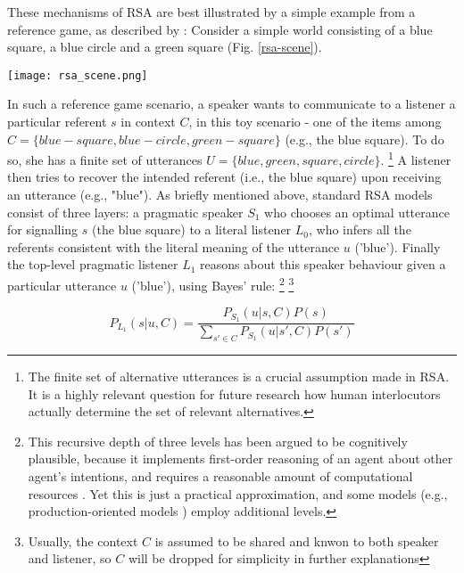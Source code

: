 These mechanisms of RSA are best illustrated by a simple example from a reference game, as described by \textcite{frank2012predicting}:
Consider a simple world consisting of a blue square, a blue circle and a green square (Fig. \ref{rsa-scene}).
\begin{figure*}[t]
	\begin{center}
		\texttt{[image: rsa\_scene.png]}
	\end{center}
	\vspace{-0.3cm}
	\caption{A simple reference resolution example scenario: the context $C$ consists of three possible referents \parencite{frank2012predicting}}
	\label{rsa-scene}
\end{figure*}
In such a reference game scenario, a speaker wants to communicate to a listener a particular referent $s$ in context $C$, in this toy scenario - one of the items among $C = \{blue-square, blue-circle, green-square\}$  (e.g., the blue square). To do so, she has a finite set of utterances $U = \{blue, green, square, circle\}$.  \footnote{The finite set of alternative utterances is a crucial assumption made in RSA. It is a highly relevant question for future research how human interlocutors actually determine the set of relevant alternatives.} A listener then tries to recover the intended referent (i.e., the blue square) upon receiving an utterance (e.g., "blue"). 
As briefly mentioned above, standard RSA models consist of three layers: a pragmatic speaker $S_1$ who chooses an optimal utterance for signalling $s$ (the blue square) to a literal listener $L_0$, who infers all the referents consistent with the literal meaning of the utterance $u$ ('blue'). Finally the top-level pragmatic listener $L_1$ reasons about this speaker behaviour given a particular utterance $u$ ('blue'), using Bayes' rule: \footnote{This recursive depth of three levels has been argued to be cognitively plausible, because it implements first-order reasoning of an agent about other agent's intentions, and requires a reasonable amount of computational resources \parencite{frank2012predicting}. Yet this is just a practical approximation, and some models (e.g., production-oriented models ) employ additional levels.\parencite{problang}} \footnote{Usually, the context $C$ is assumed to be shared and knwon to both speaker and listener, so $C$ will be dropped for simplicity in further explanations}
 
$$P_{L_1}(s | u, C) = \frac{P_{S_1}(u | s, C) P(s)}{\sum_{s' \in C} P_{S_1}(u | s', C) P(s')}$$


